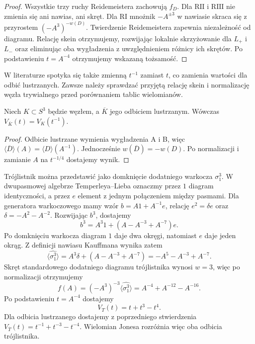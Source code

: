 \begin{proof}
Wszystkie trzy ruchy Reidemeistera zachowują $f_D$.
Dla $\mathrm{R II}$ i $\mathrm{R III}$ nie zmienia się ani
nawias, ani skręt. Dla $\mathrm{R I}$ mnożnik $-A^{\pm3}$
w nawiasie skraca się z przyrostem $(-A^3)^{-w(D)}$.
Twierdzenie Reidemeistera zapewnia niezależność od diagramu.
Relację skein otrzymujemy, rozwijając lokalnie skrzyżowanie
dla $L_+$ i $L_-$ oraz eliminując oba wygładzenia z
uwzględnieniem różnicy ich skrętów. Po podstawieniu
$t=A^{-4}$ otrzymujemy wskazaną tożsamość.
\end{proof}

\begin{uwaga}
W literaturze spotyka się także zmienną $t^{-1}$ zamiast $t$,
co zamienia wartości dla odbić lustrzanych. Zawsze należy
sprawdzać przyjętą relację skein i normalizację węzła
trywialnego przed porównaniem tablic wielomianów.
\end{uwaga}

\begin{stwierdzenie}
Niech $K\subset S^3$ będzie węzłem, a $\overline K$ jego
odbiciem lustrzanym. Wówczas
$V_{\overline K}(t)=V_K(t^{-1})$.
\end{stwierdzenie}

\begin{proof}
Odbicie lustrzane wymienia wygładzenia A i B, więc
$\langle\overline D\rangle(A)=\langle D\rangle(A^{-1})$.
Jednocześnie $w(\overline D)=-w(D)$.
Po normalizacji i zamianie $A$ na $t^{-1/4}$ dostajemy wynik.
\end{proof}

\begin{przyklad}
Trójlistnik można przedstawić jako domknięcie dodatniego warkocza
$\sigma_1^3$. W dwupasmowej algebrze Temperleya--Lieba oznaczmy przez
$1$ diagram identyczności, a przez $e$ element z jednym połączeniem
między pasmami. Dla generatora warkoczowego mamy wzór
$b=A1+A^{-1}e$, relację $e^2=\delta e$ oraz
$\delta=-A^2-A^{-2}$.
Rozwijając $b^3$, dostajemy
\[
b^3=A^3 1+(A-A^{-3}+A^{-7})e.
\]
Po domknięciu warkocza diagram $1$ daje dwa okręgi, natomiast
$e$ daje jeden okrąg. Z definicji nawiasu Kauffmana wynika zatem
\[
\langle\widehat{\sigma_1^3}\rangle
=A^3\delta+(A-A^{-3}+A^{-7})
=-A^5-A^{-3}+A^{-7}.
\]
Skręt standardowego dodatniego diagramu trójlistnika wynosi $w=3$,
więc po normalizacji otrzymujemy
\[
f(A)=(-A^3)^{-3}\langle\widehat{\sigma_1^3}\rangle
=A^{-4}+A^{-12}-A^{-16}.
\]
Po podstawieniu $t=A^{-4}$ dostajemy
\[
V_T(t)=t+t^3-t^4.
\]
Dla odbicia lustrzanego dostajemy z poprzedniego stwierdzenia
$V_{\overline T}(t)=t^{-1}+t^{-3}-t^{-4}$. Wielomian Jonesa
rozróżnia więc oba odbicia trójlistnika.
\end{przyklad}

